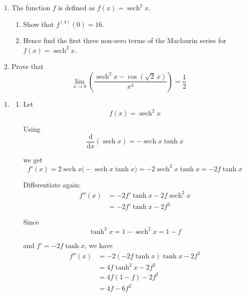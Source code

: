 \documentclass[leqno]{article}
\begin{document}
\begin{enumerate}[
  label=\textbf{\arabic*.},
  leftmargin=*,
  topsep=0pt,
  partopsep=0pt,
  parsep=0pt
]
\begin{enumerate}[label=\textbf{(\alph*)}]
  \item The function $f$ is defined as $f(x)=\operatorname{sech}^2 x$. \\
  \begin{enumerate}[label=(\roman*)]
    \item Show that $f^{(4)}(0)=16$. 
    \item Hence find the first three non-zero terms of the Maclaurin series for $f(x)=\operatorname{sech}^2 x$.  \\
  \end{enumerate}
  \item Prove that
  \[
  \lim_{x\to 0}\left(\frac{\operatorname{sech}^2 x-\cos(\sqrt{2}\,x)}{x^4}\right)=\frac{1}{2}
  \]
\end{enumerate}

\vspace*{10pt}

\begin{djsSolution}
\begin{enumerate}[label=\textbf{(\alph*)}]
  \item
  \begin{enumerate}[label=(\roman*)]
    \item Let
    \[
    f(x)=\operatorname{sech}^2 x
    \]

    Using
    \[
    \frac{\mathrm{d}}{\mathrm{d}x}(\operatorname{sech}x)=-\operatorname{sech}x\tanh x
    \]

    we get
    \[
    f'(x)=2\operatorname{sech}x\bigl(-\operatorname{sech}x\tanh x\bigr)=-2\operatorname{sech}^2x\tanh x=-2f\tanh x
    \]

    Differentiate again:
    \begin{align*}
    f''(x)
    &= -2f'\tanh x-2f\operatorname{sech}^2x \\
    &= -2f'\tanh x-2f^2
    \end{align*}

    Since
    \[
    \tanh^2x=1-\operatorname{sech}^2x=1-f
    \]

    and \(f'=-2f\tanh x\), we have
    \begin{align*}
    f''(x)
    &= -2(-2f\tanh x)\tanh x-2f^2 \\
    &= 4f\tanh^2x-2f^2 \\
    &= 4f(1-f)-2f^2 \\
    &= 4f-6f^2
    \end{align*}


\end{enumerate}
\end{enumerate}
\end{djsSolution}
\end{enumerate}
\end{document}
